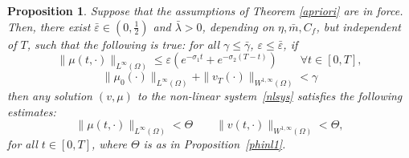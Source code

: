 \documentclass[10pt,a4paper,nouppercase,nowrite]{article}
\numberwithin{equation}{section}
\newcommand{\eps}{\varepsilon}
\newtheorem{prop}[defn]{Proposition}
\theoremstyle{definition}
\begin{document}
	\begin{prop} \label{propfix1}
		Suppose that the assumptions of Theorem \ref{apriori} are in force. Then, there exist $\bar{\eps} \in (0,\frac{1}{2}) $ and $\bar{\lambda} > 0$, depending on $\eta,\bar{m},C_f$, but independent of $T$, such that the following is true: for all $\gamma \le \bar{\gamma}$, $\eps \le \bar \eps$, if
		\begin{equation}
			\| \mu(t,\cdot)\|_{L^{\infty}(\Omega)} \le \eps \left( e^{-\sigma_1 t} + e^{-\sigma_2(T-t)} \right) \qquad \forall t \in [0,T],
			\label{epsmu}
		\end{equation}
		\begin{equation}
			\|\mu_0(\cdot)\|_{L^{\infty}(\Omega)} + \| v_T(\cdot) \|_{W^{1,\infty}(\Omega)} < \gamma
			\label{cond1}
		\end{equation}
		then any solution $(v,\mu)$ to the non-linear system~\eqref{nlsys} satisfies the following estimates:
		\begin{equation}
			\|\mu(t,\cdot)\|_{L^{\infty}(\Omega)} < \Theta \qquad \|v(t,\cdot)\|_{W^{1,\infty}(\Omega)} < \Theta,
			\label{muDvestimates}
		\end{equation}
		for all $t \in [0,T]$, where $\Theta$ is as in Proposition~\ref{phinl1}.
	\end{prop}
	
\end{document}

